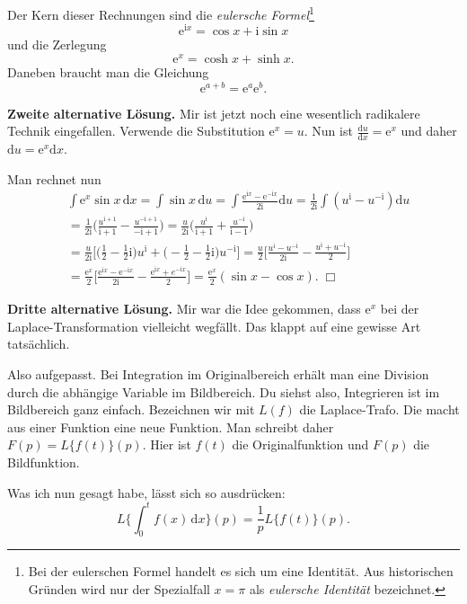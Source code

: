 \documentclass[a4paper,10pt,fleqn,twoside]{scrartcl}
\numberwithin{equation}{section}
\newcommand{\ui}{\mathrm i}
\newcommand{\ee}{\mathrm e}
\newcommand{\strong}[1]{{\normalfont\sffamily\bfseries #1}}
\theoremstyle{Aufgabe}
\begin{document}
Der Kern dieser Rechnungen sind die
\emph{eulersche Formel}\footnote{Bei der eulerschen Formel handelt
es sich um eine Identität. Aus historischen Gründen wird nur der
Spezialfall $x=\pi$ als \emph{eulersche Identität} bezeichnet.}
\begin{equation}
\ee^{\ui x}=\cos x+\ui\sin x
\end{equation}
und die Zerlegung
\begin{equation}
\ee^{x}=\cosh x+\sinh x.
\end{equation}
Daneben braucht man die Gleichung
\begin{equation}
\ee^{a+b}=\ee^a \ee^b.
\end{equation}

\strong{Zweite alternative Lösung.}
Mir ist jetzt noch eine wesentlich radikalere Technik eingefallen.
Verwende die Substitution $\ee^x=u$. Nun ist
$\frac{\mathrm du}{\mathrm dx}=\ee^x$ und daher
$\mathrm du=\ee^x \mathrm dx$.

Man rechnet nun
\begin{align}
&\int \ee^x\sin x\,\mathrm dx
 = \int \sin x\,\mathrm du = \int\frac{\ee^{\ui x}-\ee^{-\ui x}}{2\ui}\mathrm du
 = \frac{1}{2\ui}\int (u^\ui-u^{-\ui})\mathrm du\\
&= \frac{1}{2\ui}\bigg(\frac{u^{\ui+1}}{\ui+1}-\frac{u^{-\ui+1}}{-\ui+1}\bigg)
 = \frac{u}{2\ui}\bigg(\frac{u^\ui}{\ui+1}+\frac{u^{-\ui}}{\ui-1}\bigg)\\
&= \frac{u}{2\ui}\bigg[\bigg(\frac{1}{2}-\frac{1}{2}\ui\bigg)u^\ui
   +\bigg(-\frac{1}{2}-\frac{1}{2}\ui\bigg)u^{-\ui}\bigg]
 = \frac{u}{2}\bigg[\frac{u^\ui-u^{-\ui}}{2\ui}-\frac{u^\ui+u^{-\ui}}{2}\bigg]\\
&= \frac{\ee^x}{2}\bigg[\frac{\ee^{\ui x}-\ee^{-\ui x}}{2\ui}-\frac{\ee^{\ui x}+e^{-\ui x}}{2}\bigg]
 = \frac{\ee^x}{2}(\sin x-\cos x).\;\Box
\end{align}

\strong{Dritte alternative Lösung.}
Mir war die Idee gekommen, dass $\ee^x$ bei der Laplace-Transformation
vielleicht wegfällt. Das klappt auf eine gewisse Art tatsächlich.

Also aufgepasst. Bei Integration im Originalbereich erhält man eine
Division durch die abhängige Variable im Bildbereich. Du siehst also,
Integrieren ist im Bildbereich ganz einfach. Bezeichnen wir mit
$L(f)$ die Laplace-Trafo. Die macht aus einer Funktion eine neue
Funktion. Man schreibt daher $F(p)=L\{f(t)\}(p)$. Hier ist
$f(t)$ die Originalfunktion und $F(p)$ die Bildfunktion.

Was ich nun gesagt habe, lässt sich so ausdrücken:
\begin{equation}
L\bigg\{\int_0^t f(x)\,\mathrm dx\bigg\}(p) = \frac{1}{p}L\{f(t)\}(p).
\end{equation}
\end{document}
